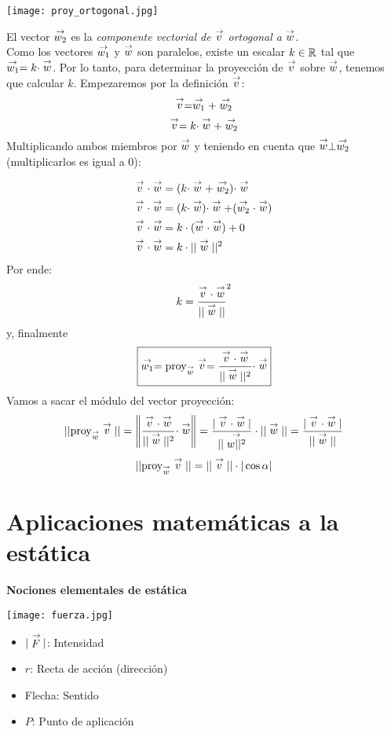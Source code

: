 \begin{center}
    \texttt{[image: proy\_ortogonal.jpg]}
\end{center}
El vector $\stackrel{\to}{w_2}$ es la \emph{componente vectorial de } $\stackrel{\to}{v}$ \emph{ortogonal a } $\stackrel{\to}{w}$.\\

Como los vectores $\stackrel{\to}{w_1}$ y $\stackrel{\to}{w}$ son paralelos, existe un escalar $k \in {\mathbb{R}}$ tal que $\stackrel{\to}{w_1} = k \cdot \stackrel{\to}{w}$. Por lo tanto, para determinar la proyección de $\stackrel{\to}{v}$ sobre $\stackrel{\to}{w}$, tenemos que calcular $k$. Empezaremos por la definición $\stackrel{\to}{v}$:
$$\stackrel{\to}{v} = \stackrel{\to}{w_1} + \stackrel{\to}{w_2}$$
$$\stackrel{\to}{v} = k \cdot \stackrel{\to}{w} + \stackrel{\to}{w_2}$$
Multiplicando ambos miembros por $\stackrel{\to}{w}$ y teniendo en cuenta que $\stackrel{\to}{w} \perp \stackrel{\to}{w_2}$ (multiplicarlos es igual a 0):

\begin{align*}
    \stackrel{\to}{v} \cdot \stackrel{\to}{w} &= (k \cdot \stackrel{\to}{w} + \stackrel{\to}{w_2}) \cdot \stackrel{\to}{w}\\
    \stackrel{\to}{v} \cdot \stackrel{\to}{w} &= (k \cdot \stackrel{\to}{w}) \cdot \stackrel{\to}{w} + (\stackrel{\to}{w_2} \cdot \stackrel{\to}{w})\\
    \stackrel{\to}{v} \cdot \stackrel{\to}{w} &= k \cdot (\stackrel{\to}{w} \cdot \stackrel{\to}{w}) + 0\\
    \stackrel{\to}{v} \cdot \stackrel{\to}{w} &= k \cdot ||\stackrel{\to}{w}||^2
\end{align*}
Por ende: 
$$k = \frac{\stackrel{\to}{v} \cdot \stackrel{\to}{w}}{||\stackrel{\to}{w}||}^2$$
y, finalmente
$$\boxed{\stackrel{\to}{w_1} = \text{proy}_{\stackrel{\to}{w}}\stackrel{\to}{v} = \frac{\stackrel{\to}{v} \cdot \stackrel{\to}{w}}{||\stackrel{\to}{w}||^2} \cdot \stackrel{\to}{w}}$$
Vamos a sacar el módulo del vector proyección:
$$||\text{proy}_{\stackrel{\to}{w}}\stackrel{\to}{v}|| = \left\| \frac{\stackrel{\to}{v} \cdot \stackrel{\to}{w}}{||\stackrel{\to}{w}||^2} \cdot \stackrel{\to}{w} \right\| = \frac{|\stackrel{\to}{v} \cdot \stackrel{\to}{w}|}{||\stackrel{\to}{w||^2}} \cdot ||\stackrel{\to}{w}|| = \frac{|\stackrel{\to}{v} \cdot \stackrel{\to}{w}|}{||\stackrel{\to}{w}||}$$
$$||\text{proy}_{\stackrel{\to}{w}} \stackrel{\to}{v}|| = ||\stackrel{\to}{v}|| \cdot |\cos \alpha|$$

\section{Aplicaciones matemáticas a la estática}

\textbf{Nociones elementales de estática}
\begin{center}
    \texttt{[image: fuerza.jpg]}
\end{center}
\begin{itemize}
    \item $|\stackrel{\to}{F}|$: Intensidad
    \item $r$: Recta de acción (dirección)
    \item Flecha: Sentido
    \item $P$: Punto de aplicación
\end{itemize}

